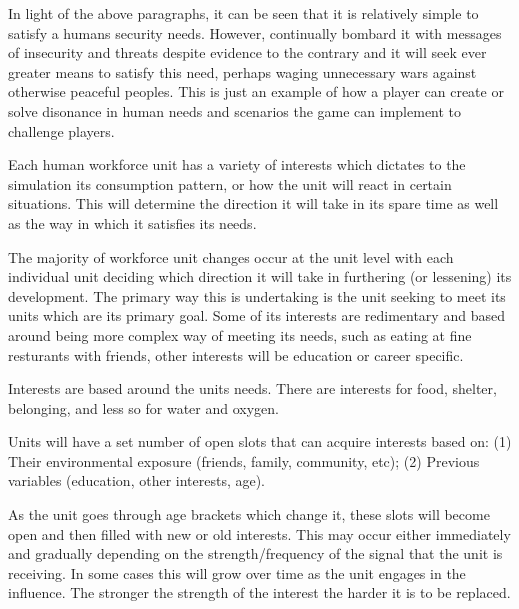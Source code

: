 In light of the above paragraphs, it can be seen that it is relatively simple to satisfy a humans security needs. However, continually bombard it with messages of insecurity and threats despite evidence to the contrary and it will seek ever greater means to satisfy this need, perhaps waging unnecessary wars against otherwise peaceful peoples. This is just an example of how a player can create or solve disonance in human needs and scenarios the game can implement to challenge players.










Each human workforce unit has a variety of interests which dictates to the simulation its consumption pattern, or how the unit will react in certain situations. This will determine the direction it will take in its spare time as well as the way in which it satisfies its needs. 

The majority of workforce unit changes occur at the unit level with each individual unit deciding which direction it will take in furthering (or lessening) its development. The primary way this is undertaking is the unit seeking to meet its units which are its primary goal. Some of its interests are redimentary and based around being more complex way of meeting its needs, such as eating at fine resturants with friends, other interests will be education or career specific. 

Interests are based around the units needs. There are interests for food, shelter, belonging, and less so for water and oxygen.

Units will have a set number of open slots that can acquire interests based on: (1) Their environmental exposure (friends, family, community, etc); (2) Previous variables (education, other interests, age).


As the unit goes through age brackets which change it, these slots will become open and then filled with new or old interests. This may occur either immediately and gradually depending on the strength/frequency of the signal that the unit is receiving. In some cases this will grow over time as the unit engages in the influence. The stronger the strength of the interest the harder it is to be replaced.

